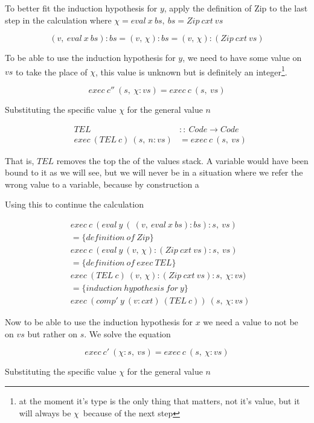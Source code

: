 \documentclass {article}
\begin{document}
To better fit the induction hypothesis for $y$,
apply the definition of Zip to the last step in the calculation
where \( \chi = eval\ x\ bs,\ bs = Zip\ cxt\ vs \)

\[ (v,\ eval\ x\ bs) :bs = (v,\, \chi):bs = (v,\, \chi):(Zip\ cxt\ vs) \]

To be able to use the induction hypothesis for $y$,
we need to have some value on $vs$ to take the place of $\chi$,
this value is unknown but is definitely an integer\footnote{
at the moment it's
type is the only thing that matters, not it's value,
but it will always be $\chi$\ because of the next step}.

\[ exec\ c''\ (s,\ \chi : vs) = exec\ c\ (s,\ vs) \]

Substituting the specific value $\chi$ for the general value $n$

\begin{eqnarray*}
&TEL\ &::\ Code \rightarrow Code \\
&exec\ (TEL\ c)\ (s,\ n:vs) &= exec\ c\ (s,\ vs)
\end{eqnarray*}

That is, $TEL$ removes the top the of the values stack.
A variable would have been bound to it as we will see,
but we will never be in a situation where we refer the wrong
value to a variable, because by construction a 

Using this to continue the calculation

\begin{align*}
&exec\ c\ (eval\ y\ (\ (v,\ eval\ x\ bs) :bs) : s,\ vs) \\
&= \{ definition\ of\ Zip \} \\
&exec\ c\ (eval\ y\ (v,\, \chi):(Zip\ cxt\ vs) : s,\ vs) \\
&= \{ definition\ of\ exec\ TEL\} \\
&exec\ (TEL\ c)\ (v,\, \chi):(Zip\ cxt\ vs) : s,\ \chi : vs) \\
&= \{ induction\ hypothesis\ for\ y \} \\
&exec\ (comp'\ y\ (v:cxt)\ (TEL\ c))\ (s,\ \chi : vs)
\end{align*}

Now to be able to use the induction hypothesis for $x$
we need a value to not be on $vs$ but rather on $s$.
We solve the equation 

\[ exec\ c'\ (\chi : s,\ vs) = exec\ c\ (s,\ \chi : vs) \]

Substituting the specific value $\chi$ for the general value $n$
\end{document}
